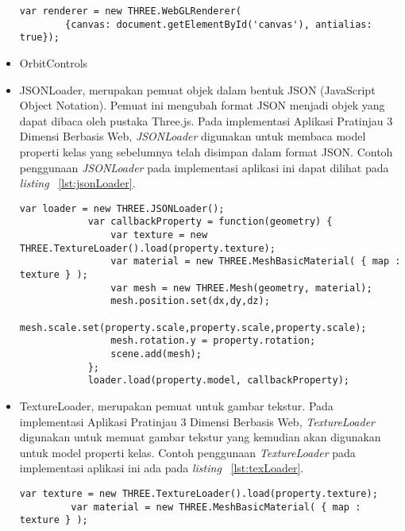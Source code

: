 \begin{itemize}
\begin{lstlisting}[caption={Contoh penggunaan {\it WebGLRenderer} pada implementasi Aplikasi Pratinjau 3 Dimensi Berbasis Web dengan batasan area hanya pada elemen {\it canvas}}, label={lst:webglRenderer},captionpos=b]
	    var renderer = new THREE.WebGLRenderer(
	    {canvas: document.getElementById('canvas'), antialias: true});
\end{lstlisting}
	\item OrbitControls 
	\item JSONLoader, merupakan pemuat objek dalam bentuk JSON (JavaScript Object Notation). Pemuat ini mengubah format JSON menjadi objek yang dapat dibaca oleh pustaka Three.js. Pada implementasi Aplikasi Pratinjau 3 Dimensi Berbasis Web, {\it JSONLoader} digunakan untuk membaca model properti kelas yang sebelumnya telah disimpan dalam format JSON. Contoh penggunaan {\it JSONLoader} pada implementasi aplikasi ini dapat dilihat pada {\it listing} ~\ref{lst:jsonLoader}.
\begin{lstlisting}[caption={Contoh penggunaan {\it JSONLoader} pada implementasi Aplikasi Pratinjau 3 Dimensi Berbasis Web}, label={lst:jsonLoader},captionpos=b]
	   var loader = new THREE.JSONLoader();
            var callbackProperty = function(geometry) {
                var texture = new THREE.TextureLoader().load(property.texture);
                var material = new THREE.MeshBasicMaterial( { map : texture } ); 
                var mesh = new THREE.Mesh(geometry, material);
                mesh.position.set(dx,dy,dz);
                mesh.scale.set(property.scale,property.scale,property.scale);
                mesh.rotation.y = property.rotation;
                scene.add(mesh);
            };
            loader.load(property.model, callbackProperty);
\end{lstlisting}
	\item TextureLoader, merupakan pemuat untuk gambar tekstur. Pada implementasi Aplikasi Pratinjau 3 Dimensi Berbasis Web, {\it TextureLoader} digunakan untuk memuat gambar tekstur yang kemudian akan digunakan untuk model properti kelas. Contoh penggunaan {\it TextureLoader} pada implementasi aplikasi ini ada pada {\it listing} ~\ref{lst:texLoader}.
\begin{lstlisting}[caption={Contoh penggunaan {\it TextureLoader} untuk tekstur suatu {\it mesh} yang akan ditambahkan ke {\it Scene} pada implementasi Aplikasi Pratinjau 3 Dimensi Berbasis Web}, label={lst:texLoader},captionpos=b]
  	var texture = new THREE.TextureLoader().load(property.texture);
         var material = new THREE.MeshBasicMaterial( { map : texture } ); 

\end{lstlisting}
\end{itemize}
